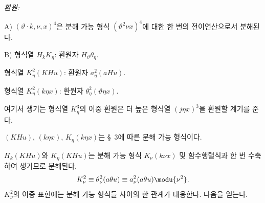 
\noindent\emph{환원:}

\noindent A) $(\vartheta\cdot k,\nu,x)^4$은 분해 가능 형식 $(\vartheta^2\nu x)^4$에 대한 한 번의 전이연산으로서 분해된다.

\noindent B) 형식열 $H_kK_\eta$: 환원자 $H_\vartheta\theta_\eta$.

형식열 $K_\eta^2(KHu)$: 환원자 $a_\eta^2(aHu)$.

형식열 $K_\eta^2(k\eta x)$: 환원자 $\theta_\eta^2(\vartheta\eta x)$.

여기서 생기는 형식열 $K_\eta^3$의 이중 환원은 더 높은 형식열 $(j\eta x)^3$을 환원할 계기를 준다.

$(KHu)$, $(k\eta x)$, $K_\eta(k\eta x)$는 \S\ 3에 따른 분해 가능 형식이다.

$H_k(KHu)$와 $K_\eta(KHu)$는 분해 가능 형식 $K_\nu(k\nu x)$ 및 함수행렬식과 한 번 수축하여 생기므로 분해된다.
\[
K_\nu^2\equiv\theta_\nu^2(a\theta u)\equiv a_\nu^2(a\theta u)\modu{\nu^2}.
\]
$K_\nu^2$의 이중 표현에는 분해 가능 형식들 사이의 한 관계가 대응한다. 다음을 얻는다.
